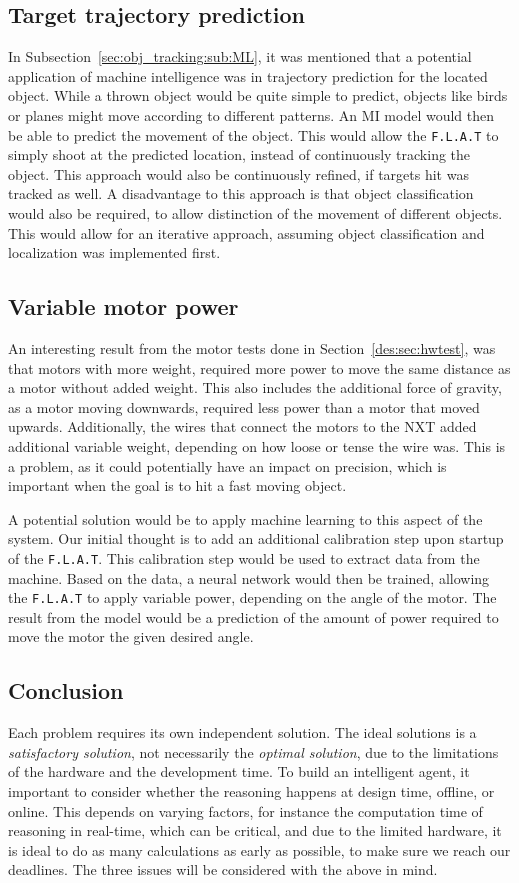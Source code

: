 \subsection{Target trajectory prediction}
In Subsection~\ref{sec:obj_tracking:sub:ML}, it was mentioned that a potential application of machine intelligence was in trajectory prediction for the located object.
While a thrown object would be quite simple to predict, objects like birds or planes might move according to different patterns.
An MI model would then be able to predict the movement of the object.
This would allow the \texttt{F.L.A.T} to simply shoot at the predicted location, instead of continuously tracking the object.
This approach would also be continuously refined, if targets hit was tracked as well.
A disadvantage to this approach is that object classification would also be required, to allow distinction of the movement of different objects.
This would allow for an iterative approach, assuming object classification and localization was implemented first.

\subsection{Variable motor power}
An interesting result from the motor tests done in Section~\ref{des:sec:hwtest}, was that motors with more weight, required more power to move the same distance as a motor without added weight.
This also includes the additional force of gravity, as a motor moving downwards, required less power than a motor that moved upwards.
Additionally, the wires that connect the motors to the NXT added additional variable weight, depending on how loose or tense the wire was.
This is a problem, as it could potentially have an impact on precision, which is important when the goal is to hit a fast moving object.

A potential solution would be to apply machine learning to this aspect of the system.
Our initial thought is to add an additional calibration step upon startup of the \texttt{F.L.A.T}.
This calibration step would be used to extract data from the machine.
Based on the data, a neural network would then be trained, allowing the \texttt{F.L.A.T} to apply variable power, depending on the angle of the motor.
The result from the model would be a prediction of the amount of power required to move the motor the given desired angle.


\subsection{Conclusion}\label{Design:MI:sub:conclusion}
Each problem requires its own independent solution.
The ideal solutions is a \textit{satisfactory solution}, not necessarily the \textit{optimal solution}, due to the limitations of the hardware and the development time.
To build an intelligent agent, it important to consider whether the reasoning happens at design time, offline, or online.
This depends on varying factors, for instance the computation time of reasoning in real-time, which can be critical, and due to the limited hardware, it is ideal to do as many calculations as early as possible, to make sure we reach our deadlines.
The three issues will be considered with the above in mind.

